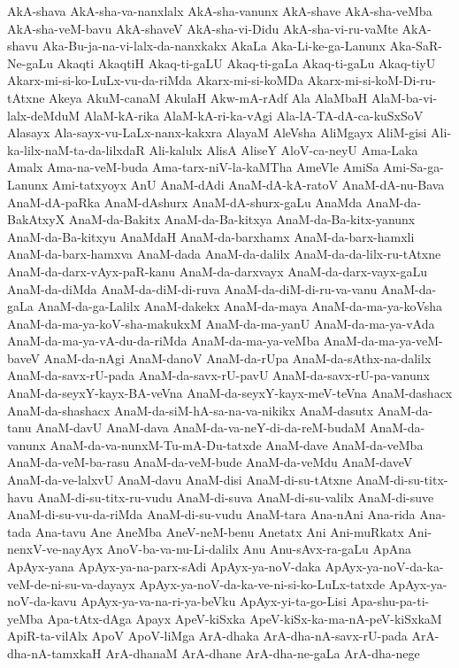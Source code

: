 {AkA-shava
AkA-sha-va-nanxlalx
AkA-sha-vanunx
AkA-shave
AkA-sha-veMba
AkA-sha-veM-bavu
AkA-shaveV
AkA-sha-vi-Didu
AkA-sha-vi-ru-vaMte
AkA-shavu
Aka-Bu-ja-na-vi-lalx-da-nanxkakx
AkaLa
Aka-Li-ke-ga-Lanunx
Aka-SaR-Ne-gaLu
Akaqti
AkaqtiH
Akaq-ti-gaLU
Akaq-ti-gaLa
Akaq-ti-gaLu
Akaq-tiyU
Akarx-mi-si-ko-LuLx-vu-da-riMda
Akarx-mi-si-koMDa
Akarx-mi-si-koM-Di-ru-tAtxne
Akeya
AkuM-canaM
AkulaH
Akw-mA-rAdf
Ala
AlaMbaH
AlaM-ba-vi-lalx-deMduM
AlaM-kA-rika
AlaM-kA-ri-ka-vAgi
Ala-lA-TA-dA-ca-kuSxSoV
Alasayx
Ala-sayx-vu-LaLx-nanx-kakxra
AlayaM
AleVsha
AliMgayx
AliM-gisi
Ali-ka-lilx-naM-ta-da-lilxdaR
Ali-kalulx
AlisA
AliseY
AloV-ca-neyU
Ama-Laka
Amalx
Ama-na-veM-buda
Ama-tarx-niV-la-kaMTha
AmeVle
AmiSa
Ami-Sa-ga-Lanunx
Ami-tatxyoyx
AnU
AnaM-dAdi
AnaM-dA-kA-ratoV
AnaM-dA-nu-Bava
AnaM-dA-paRka
AnaM-dAshurx
AnaM-dA-shurx-gaLu
AnaMda
AnaM-da-BakAtxyX
AnaM-da-Bakitx
AnaM-da-Ba-kitxya
AnaM-da-Ba-kitx-yanunx
AnaM-da-Ba-kitxyu
AnaMdaH
AnaM-da-barxhamx
AnaM-da-barx-hamxli
AnaM-da-barx-hamxva
AnaM-dada
AnaM-da-dalilx
AnaM-da-da-lilx-ru-tAtxne
AnaM-da-darx-vAyx-paR-kanu
AnaM-da-darxvayx
AnaM-da-darx-vayx-gaLu
AnaM-da-diMda
AnaM-da-diM-di-ruva
AnaM-da-diM-di-ru-va-vanu
AnaM-da-gaLa
AnaM-da-ga-Lalilx
AnaM-dakekx
AnaM-da-maya
AnaM-da-ma-ya-koVsha
AnaM-da-ma-ya-koV-sha-makukxM
AnaM-da-ma-yanU
AnaM-da-ma-ya-vAda
AnaM-da-ma-ya-vA-du-da-riMda
AnaM-da-ma-ya-veMba
AnaM-da-ma-ya-veM-baveV
AnaM-da-nAgi
AnaM-danoV
AnaM-da-rUpa
AnaM-da-sAthx-na-dalilx
AnaM-da-savx-rU-pada
AnaM-da-savx-rU-pavU
AnaM-da-savx-rU-pa-vanunx
AnaM-da-seyxY-kayx-BA-veVna
AnaM-da-seyxY-kayx-meV-teVna
AnaM-dashacx
AnaM-da-shashacx
AnaM-da-siM-hA-sa-na-va-nikikx
AnaM-dasutx
AnaM-da-tanu
AnaM-davU
AnaM-dava
AnaM-da-va-neY-di-da-reM-budaM
AnaM-da-vanunx
AnaM-da-va-nunxM-Tu-mA-Du-tatxde
AnaM-dave
AnaM-da-veMba
AnaM-da-veM-ba-rasu
AnaM-da-veM-bude
AnaM-da-veMdu
AnaM-daveV
AnaM-da-ve-lalxvU
AnaM-davu
AnaM-disi
AnaM-di-su-tAtxne
AnaM-di-su-titx-havu
AnaM-di-su-titx-ru-vudu
AnaM-di-suva
AnaM-di-su-valilx
AnaM-di-suve
AnaM-di-su-vu-da-riMda
AnaM-di-su-vudu
AnaM-tara
Ana-nAni
Ana-rida
Ana-tada
Ana-tavu
Ane
AneMba
AneV-neM-benu
Anetatx
Ani
Ani-muRkatx
Ani-nenxV-ve-nayAyx
AnoV-ba-va-nu-Li-dalilx
Anu
Anu-sAvx-ra-gaLu
ApAna
ApAyx-yana
ApAyx-ya-na-parx-sAdi
ApAyx-ya-noV-daka
ApAyx-ya-noV-da-ka-veM-de-ni-su-va-dayayx
ApAyx-ya-noV-da-ka-ve-ni-si-ko-LuLx-tatxde
ApAyx-ya-noV-da-kavu
ApAyx-ya-va-na-ri-ya-beVku
ApAyx-yi-ta-go-Lisi
Apa-shu-pa-ti-yeMba
Apa-tAtx-dAga
Apayx
ApeV-kiSxka
ApeV-kiSx-ka-ma-nA-peV-kiSxkaM
ApiR-ta-vilAlx
ApoV
ApoV-liMga
ArA-dhaka
ArA-dha-nA-savx-rU-pada
ArA-dha-nA-tamxkaH
ArA-dhanaM
ArA-dhane
ArA-dha-ne-gaLa
ArA-dha-nege
}
